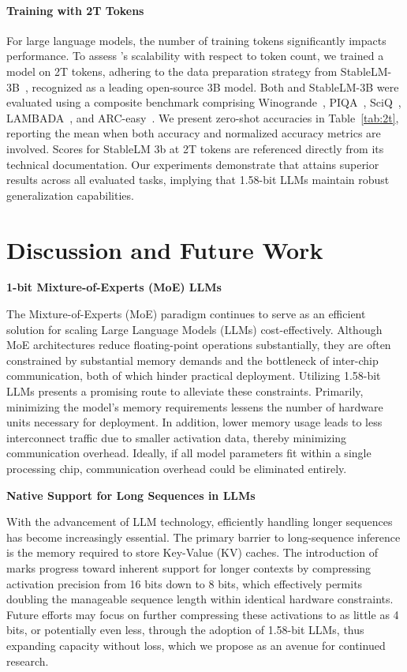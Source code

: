 \paragraph{Training with 2T Tokens}

For large language models, the number of training tokens significantly impacts performance. To assess 's scalability with respect to token count, we trained a  model on 2T tokens, adhering to the data preparation strategy from StableLM-3B~\cite{StableLM-3B-4E1T}, recognized as a leading open-source 3B model. Both  and StableLM-3B were evaluated using a composite benchmark comprising Winogrande~\cite{winoGrande}, PIQA~\cite{piqa}, SciQ~\cite{sciq}, LAMBADA~\cite{lambada}, and ARC-easy~\cite{arc}. We present zero-shot accuracies in Table~\ref{tab:2t}, reporting the mean when both accuracy and normalized accuracy metrics are involved. Scores for StableLM 3b at 2T tokens are referenced directly from its technical documentation. Our experiments demonstrate that  attains superior results across all evaluated tasks, implying that 1.58-bit LLMs maintain robust generalization capabilities.

\section{Discussion and Future Work}

\textbf{1-bit Mixture-of-Experts (MoE) LLMs}

The Mixture-of-Experts (MoE) paradigm continues to serve as an efficient solution for scaling Large Language Models (LLMs) cost-effectively. Although MoE architectures reduce floating-point operations substantially, they are often constrained by substantial memory demands and the bottleneck of inter-chip communication, both of which hinder practical deployment. Utilizing 1.58-bit LLMs presents a promising route to alleviate these constraints. Primarily, minimizing the model's memory requirements lessens the number of hardware units necessary for deployment. In addition, lower memory usage leads to less interconnect traffic due to smaller activation data, thereby minimizing communication overhead. Ideally, if all model parameters fit within a single processing chip, communication overhead could be eliminated entirely.

\textbf{Native Support for Long Sequences in LLMs}

With the advancement of LLM technology, efficiently handling longer sequences has become increasingly essential. The primary barrier to long-sequence inference is the memory required to store Key-Value (KV) caches. The introduction of  marks progress toward inherent support for longer contexts by compressing activation precision from 16 bits down to 8 bits, which effectively permits doubling the manageable sequence length within identical hardware constraints. Future efforts may focus on further compressing these activations to as little as 4 bits, or potentially even less, through the adoption of 1.58-bit LLMs, thus expanding capacity without loss, which we propose as an avenue for continued research.

